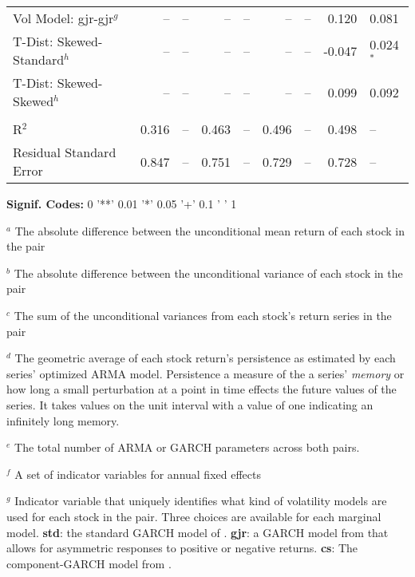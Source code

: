 \begin{table}
\begin{tabular}{l r l r l r l r l}
        Vol Model: gjr-gjr$^{g}$           &      -- & --           &      -- & --           &      -- & --           &   0.120 & 0.081         \\
        T-Dist: Skewed-Standard$^{h}$      &      -- & --           &      -- & --           &      -- & --           &  -0.047 & 0.024$^{*}$   \\
        T-Dist: Skewed-Skewed$^{h}$        &      -- & --           &      -- & --           &      -- & --           &   0.099 & 0.092         \\  \\
        R$^{2}$                            &   0.316 & --           &   0.463 & --           &   0.496 & --           &   0.498 & --            \\
        Residual Standard Error            &   0.847 & --           &   0.751 & --           &   0.729 & --           &   0.728 & --            \\
        \midrule
    \end{tabular}
    \begin{tablenotes}
        \item{\footnotesize \textbf{Signif. Codes:} 0 '**' 0.01 '*' 0.05 '+' 0.1 ' ' 1}
        \item {$^{a}$ The absolute difference between the unconditional mean return of each stock in the pair}
        \item {$^{b}$ The absolute difference between the unconditional variance of each stock in the pair}
        \item {$^{c}$ The sum of the unconditional variances from each stock's return series in the pair}
        \item {$^{d}$ The geometric average of each stock return's persistence as estimated by each series' optimized ARMA model. Persistence a measure of the a series' \textit{memory} or how long a small perturbation at a point in time effects the future values of the series. It takes values on the unit interval with a value of one indicating an infinitely long memory.}
        \item {$^{e}$ The total number of ARMA or GARCH parameters across both pairs.}
        \item {$^{f}$ A set of indicator variables for annual fixed effects}
        \item {$^{g}$ Indicator variable that uniquely identifies what kind of volatility models are used for each stock in the pair. Three choices are available for each marginal model. \textbf{std}: the standard GARCH model of \cite{Bollerslev1986Garch}. \textbf{gjr}: a GARCH model from \cite{GJR_1993} that allows for asymmetric responses to positive or negative returns. \textbf{cs}: The component-GARCH model from \cite{EngleLee1993APA}.}

\end{tablenotes}
\end{table}
